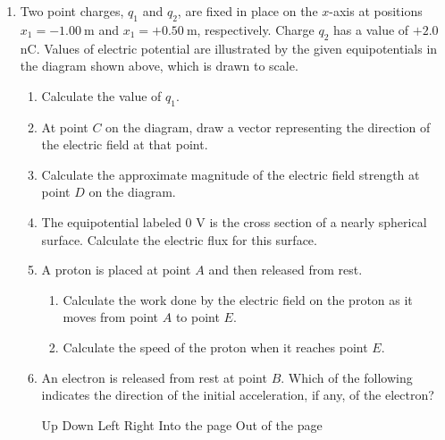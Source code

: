 \documentclass{../../../oss-classkick}
\begin{document}
\begin{enumerate}
\item Two point charges, $q_1$ and $q_2$, are fixed in place on the $x$-axis at
  positions $x_1=\SI{-1.00}{\metre}$ and $x_1=+\SI{0.50}{\metre}$,
  respectively. Charge $q_2$ has a value of $+2.0$ nC. Values of electric
  potential are illustrated by the given equipotentials in the diagram shown
  above, which is drawn to scale.
  \begin{enumerate}
  \item Calculate the value of $q_1$.
  \item At point $C$ on the diagram, draw a vector representing the direction
    of the electric field at that point.
  \item Calculate the approximate magnitude of the electric field strength at
    point $D$ on the diagram.
  \item The equipotential labeled 0 V is the cross section of a nearly
    spherical surface. Calculate the electric flux for this surface.
  \item A proton is placed at point $A$ and then released from rest.
    \begin{enumerate}
    \item Calculate the work done by the electric field on the proton as it
      moves from point $A$ to point $E$.
    \item Calculate the speed of the proton when it reaches point $E$.
    \end{enumerate}
  \item An electron is released from rest at point $B$. Which of the following
    indicates the direction of the initial acceleration, if any, of the
    electron?

    \vspace{.1in}
    \underline{\hspace{.3in}} Up\hspace{.2in}
    \underline{\hspace{.3in}} Down\hspace{.2in}
    \underline{\hspace{.3in}} Left\hspace{.2in}
    \underline{\hspace{.3in}} Right\hspace{.2in}
    \underline{\hspace{.3in}} Into the page\hspace{.2in}
    \underline{\hspace{.3in}} Out of the page


\end{enumerate}
\end{enumerate}
\end{document}
